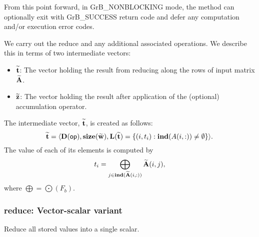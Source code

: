From this point forward, in {\sf GrB\_NONBLOCKING} mode, the method can 
optionally exit with {\sf GrB\_SUCCESS} return code and defer any computation 
and/or execution error codes.

We carry out the reduce and any additional 
associated operations.  We describe this in terms of two intermediate vectors:
\begin{itemize}
    \item ${\bf \widetilde{t}}$: The vector holding the result from reducing along the rows of input matrix
    ${\bf \widetilde{A}}$.

    \item ${\bf \widetilde{z}}$: The vector holding the result after 
    application of the (optional) accumulation operator.
\end{itemize}

The intermediate vector, ${\bf \widetilde{t}}$, is created as follows:
\[
{\bf \widetilde{t}} = \langle
\bold{D}({\sf op}), \bold{size}({\bf \widetilde{w}}),
\bold{L}({\bf \widetilde{t}}) =
\{(i,t_i) : \bold{ind}(A(i,:)) \neq \emptyset   \} \rangle. 
\]
The value of each of its elements is computed by
\[
	t_i = \bigoplus_{j \in \bold{ind}({\bf \widetilde{A}}(i,:))} {\bf \widetilde{A}}(i,j), 
\]
where $\bigoplus = \bigodot(F_b)$.







\subsubsection{{\sf reduce}: Vector-scalar variant}
\label{Sec:Reduce_vector_scalar}

Reduce all stored values into a single scalar.

\paragraph{\syntax}

